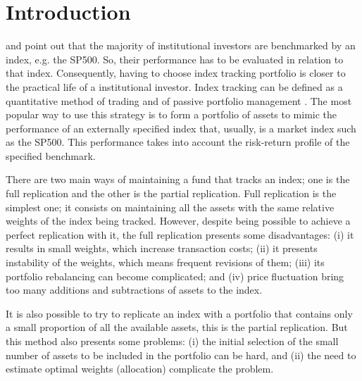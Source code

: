 \documentclass[preprint,authoryear,review,12pt]{elsarticle}
\begin{document}
\clearpage

\section{Introduction} \label{sec:intro}


\cite{tz2011} and \cite{liu-2009} point out that the majority of institutional investors are benchmarked by an index, e.g. the SP500.
So, their performance has to be evaluated in relation to that index.
Consequently, having to choose index tracking portfolio is closer to the practical life of a institutional investor.
Index tracking can be defined as a quantitative method of trading and of passive portfolio management \citep{PLS10, nnl14}.
The most popular way to use this strategy is to form a portfolio of assets to mimic the performance of an externally specified index that, usually, is a market index such as the SP500.
This performance takes into account the risk-return profile of the specified benchmark.

There are two main ways of maintaining a fund that tracks an index; one is the full replication and the other is the partial replication.
Full replication is the simplest one; it consists on maintaining all the assets with the same relative weights of the index being tracked.
However, despite being possible to achieve a perfect replication with it, the full replication presents some disadvantages:
(i) it results in small weights, which increase transaction costs;
(ii) it presents instability of the weights, which means frequent revisions of them;
(iii) its portfolio rebalancing can become complicated; 
and (iv) price fluctuation bring too many additions and subtractions of assets to the index.

It is also possible to try to replicate an index with a portfolio that contains only a small proportion of all the available assets, this is the partial replication.
But this method also presents some problems:
(i) the initial selection of the small number of assets to be included in the portfolio can be hard, and
(ii) the need to estimate optimal weights (allocation) complicate the problem.
\end{document}
